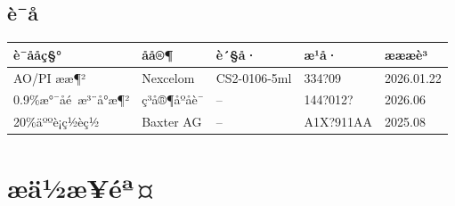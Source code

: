\documentclass[UTF8,10pt,a4paper,fontset=fandol]{ctexart}
\newcommand{\fieldvalue}[1]{#1}
\newcommand{\handwritten}[1]{#1}
\begin{document}
\subsection{è¯å}

\begin{tabularx}{\textwidth}{|X|X|X|X|X|}
\hline
è¯ååç§° & åå®¶ & è´§å· & æ¹å· & æææè³\\
\hline
AO/PI ææ¶² &
\fieldvalue{Nexcelom} &
\fieldvalue{CS2-0106-5ml} &
\fieldvalue{\handwritten{334?09}} &
\fieldvalue{\handwritten{2026.01.22}}\\
\hline
0.9\%æ°¯åé æ³¨å°æ¶² &
\fieldvalue{ç³å®¶åºåè¯} &
\fieldvalue{--} &
\fieldvalue{\handwritten{144?012?}} &
\fieldvalue{\handwritten{2026.06}}\\
\hline
20\%äººè¡ç½èç½ &
\fieldvalue{Baxter AG} &
\fieldvalue{--} &
\fieldvalue{\handwritten{A1X?911AA}} &
\fieldvalue{\handwritten{2025.08}}\\
\hline
\end{tabularx}

\section{æä½æ­¥éª¤}
\end{document}
